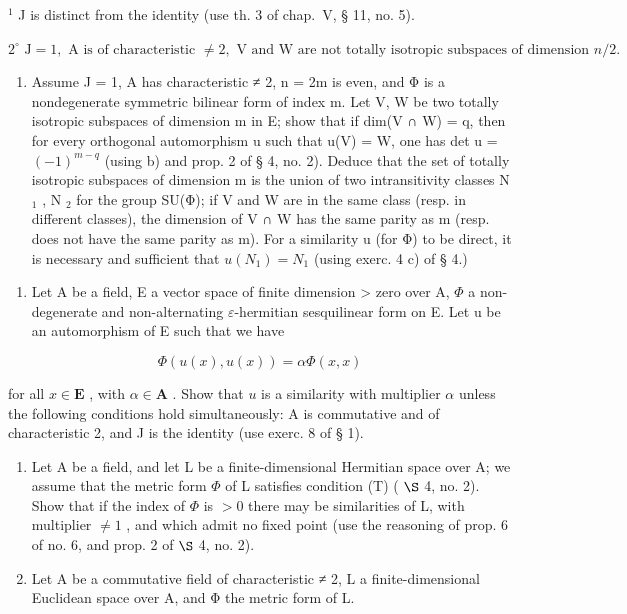 \(^{1}\) J is distinct from the identity (use th. 3 of chap.~V, § 11, no. 5).

\(2^{\circ} \text{ J} = 1, \text{ A is of characteristic } \neq 2, \text{ V and W are not totally isotropic subspaces of dimension } n/2.\)

\begin{enumerate}
\def\labelenumi{\alph{enumi})}
\setcounter{enumi}{3}
\tightlist
\item
  Assume J = 1, A has characteristic ≠ 2, n = 2m is even, and Φ is a nondegenerate symmetric bilinear form of index m. Let V, W be two totally isotropic subspaces of dimension m in E; show that if dim(V ∩ W) = q, then for every orthogonal automorphism u such that u(V) = W, one has det u = \((-1)^{m-q}\) (using b) and prop. 2 of § 4, no. 2). Deduce that the set of totally isotropic subspaces of dimension m is the union of two intransitivity classes N \(_{1}\) , N \(_{2}\) for the group SU(Φ); if V and W are in the same class (resp. in different classes), the dimension of V ∩ W has the same parity as m (resp. does not have the same parity as m). For a similarity u (for Φ) to be direct, it is necessary and sufficient that \(u(N_{1}) = N_{1}\) (using exerc. 4 c) of § 4.)
\end{enumerate}

\begin{enumerate}
\def\labelenumi{\arabic{enumi})}
\setcounter{enumi}{18}
\tightlist
\item
  Let A be a field, E a vector space of finite dimension \textgreater{} zero over A, \(\Phi\) a non-degenerate and non-alternating \(\varepsilon\)-hermitian sesquilinear form on E. Let u be an automorphism of E such that we have
\end{enumerate}

\[
\Phi (u (x), u (x)) = \alpha \Phi (x, x)
\]

for all \(x \in \mathbf{E}\) , with \(\alpha \in \mathbf{A}\) . Show that \(u\) is a similarity with multiplier \(\alpha\) unless the following conditions hold simultaneously: A is commutative and of characteristic 2, and J is the identity (use exerc. 8 of § 1).

\begin{enumerate}
\def\labelenumi{\arabic{enumi})}
\setcounter{enumi}{19}
\item
  Let A be a field, and let L be a finite-dimensional Hermitian space over A; we assume that the metric form \(\Phi\) of L satisfies condition (T) ( \(\S\) 4, no. 2). Show that if the index of \(\Phi\) is \(>0\) there may be similarities of L, with multiplier \(\neq 1\) , and which admit no fixed point (use the reasoning of prop. 6 of no. 6, and prop. 2 of \(\S\) 4, no. 2).
\item
  Let A be a commutative field of characteristic ≠ 2, L a finite-dimensional Euclidean space over A, and Φ the metric form of L.
\end{enumerate}

